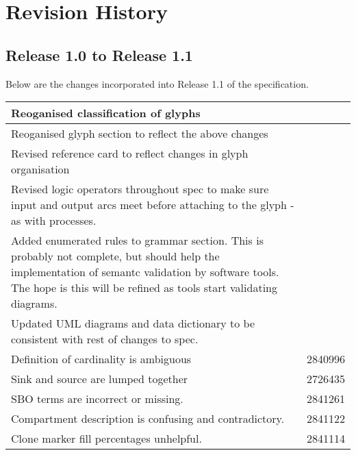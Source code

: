 \chapter{Revision History}

\section{Release 1.0 to Release 1.1}

Below are the changes incorporated into Release 1.1 of the \SBGNPDLone specification.

\begin{center}
\label{tab:revision history}
\tablelasttail{\hline}
\begin{supertabular}{|p{12cm}|c|}\hline
Reoganised classification of glyphs & \\\hline
Reoganised glyph section to reflect the above changes & \\\hline
Revised reference card to reflect changes in glyph organisation &
\\\hline
Revised logic operators throughout spec to make sure input and output
arcs meet before attaching to the glyph - as with processes. &
\\\hline
Added enumerated rules to grammar section. This is probably not
complete, but should help the implementation of semantc validation by
software tools. The hope is this will be refined as tools start
validating diagrams. & \\\hline
Updated UML diagrams and data dictionary  to be consistent with rest
of changes to spec. & \\\hline
Definition of cardinality is ambiguous & 2840996 \\\hline
Sink and source are lumped together & 2726435 \\\hline
SBO terms are incorrect or missing. & 2841261 \\\hline
Compartment description is confusing and contradictory. & 2841122
\\\hline
Clone marker fill percentages unhelpful. & 2841114 \\\hline

\end{supertabular}
\end{center}
